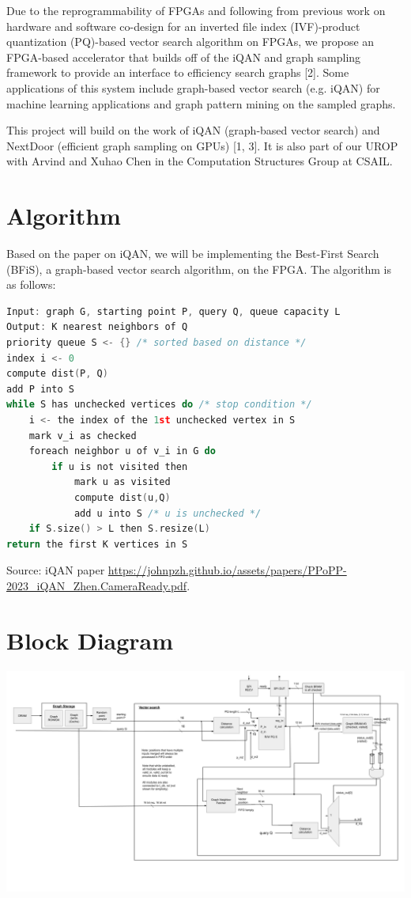 \documentclass{article}
\begin{document}
Due to the reprogrammability of FPGAs and following from previous work on hardware and software co-design for an inverted file index (IVF)-product quantization (PQ)-based vector search algorithm on FPGAs, we propose an FPGA-based accelerator that builds off of the iQAN and graph sampling framework to provide an interface to efficiency search graphs [2]. 
Some applications of this system include graph-based vector search (e.g. iQAN) for machine learning applications and graph pattern mining on the sampled graphs.

This project will build on the work of iQAN (graph-based vector search) and NextDoor (efficient graph sampling on GPUs) [1, 3]. It is also part of our UROP with Arvind and Xuhao Chen in the Computation Structures Group at CSAIL.


\section{Algorithm}
Based on the paper on iQAN, we will be implementing the Best-First Search (BFiS), a graph-based vector search algorithm, on the FPGA. The algorithm is as follows:

\begin{lstlisting}[language=c]
Input: graph G, starting point P, query Q, queue capacity L
Output: K nearest neighbors of Q
priority queue S <- {} /* sorted based on distance */
index i <- 0
compute dist(P, Q)
add P into S
while S has unchecked vertices do /* stop condition */
    i <- the index of the 1st unchecked vertex in S
    mark v_i as checked
    foreach neighbor u of v_i in G do
        if u is not visited then
            mark u as visited
            compute dist(u,Q)
            add u into S /* u is unchecked */
    if S.size() > L then S.resize(L)
return the first K vertices in S
\end{lstlisting}


Source: iQAN paper \href{https://johnpzh.github.io/assets/papers/PPoPP-2023_iQAN_Zhen.CameraReady.pdf}{https://johnpzh.github.io/assets/papers/PPoPP-2023\_iQAN\_Zhen.CameraReady.pdf}.
      
\section{Block Diagram}

\includegraphics[width=18cm]{BlockDiagram2.png}
\end{document}
